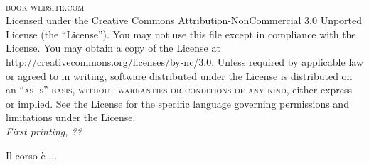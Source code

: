\documentclass[11pt,fleqn]{book} %
\begin{document}

\newpage
~\vfill
\thispagestyle{empty}



\noindent \textsc{book-website.com}\\ %

\noindent Licensed under the Creative Commons Attribution-NonCommercial 3.0 Unported License (the ``License''). You may not use this file except in compliance with the License. You may obtain a copy of the License at \url{http://creativecommons.org/licenses/by-nc/3.0}. Unless required by applicable law or agreed to in writing, software distributed under the License is distributed on an \textsc{``as is'' basis, without warranties or conditions of any kind}, either express or implied. See the License for the specific language governing permissions and limitations under the License.\\ %

\noindent \textit{First printing, ??} %


\newpage
\thispagestyle{empty}

\vspace{3cm}

\noindent Il corso è ...




\pagestyle{empty} %

\tableofcontents %

\cleardoublepage %
\end{document}
